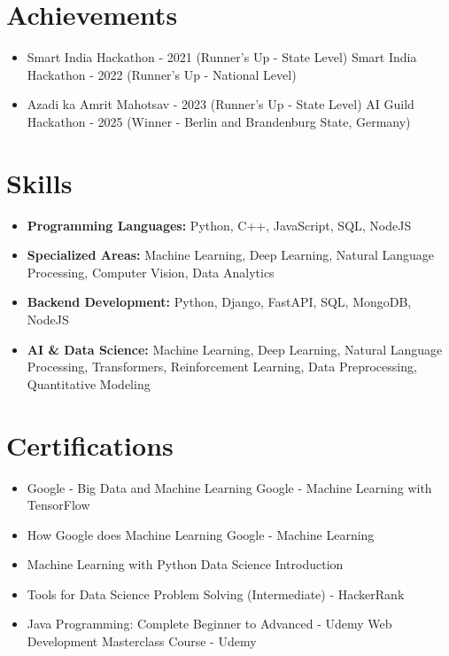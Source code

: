 \documentclass[a4paper,10pt]{article}
\begin{document}
\section*{Achievements}
\begin{itemize}
\item Smart India Hackathon - 2021 (Runner's Up - State Level) \hfill Smart India Hackathon - 2022 (Runner's Up - National Level)
\item Azadi ka Amrit Mahotsav - 2023 (Runner's Up - State Level) \hfill AI Guild Hackathon - 2025 (Winner - Berlin and Brandenburg State, Germany)
\end{itemize}

\section*{Skills}
\begin{itemize}
  \item \textbf{Programming Languages:} Python, C++, JavaScript, SQL, NodeJS
  \item \textbf{Specialized Areas:} Machine Learning, Deep Learning, Natural Language Processing, Computer Vision, Data Analytics
  \item \textbf{Backend Development:} Python, Django, FastAPI, SQL, MongoDB, NodeJS
  \item \textbf{AI \& Data Science:} Machine Learning, Deep Learning, Natural Language Processing, Transformers, Reinforcement Learning, Data Preprocessing, Quantitative Modeling
\end{itemize}

\section*{Certifications}
\begin{itemize}
\item Google - Big Data and Machine Learning \hfill Google - Machine Learning with TensorFlow
\item How Google does Machine Learning \hfill Google - Machine Learning
\item Machine Learning with Python \hfill Data Science Introduction
\item Tools for Data Science \hfill Problem Solving (Intermediate) - HackerRank
\item Java Programming: Complete Beginner to Advanced - Udemy \hfill Web Development Masterclass Course - Udemy
\end{itemize}
\end{document}
